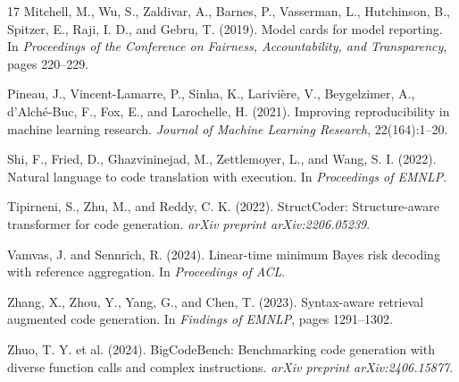 \documentclass{article}
\begin{document}
\begin{thebibliography}{17}
Mitchell, M., Wu, S., Zaldivar, A., Barnes, P., Vasserman, L., Hutchinson, B., Spitzer, E., Raji, I. D., and Gebru, T. (2019).
Model cards for model reporting.
In \emph{Proceedings of the Conference on Fairness, Accountability, and Transparency}, pages 220--229.

Pineau, J., Vincent-Lamarre, P., Sinha, K., Larivi\`ere, V., Beygelzimer, A., d'Alch\'e-Buc, F., Fox, E., and Larochelle, H. (2021).
Improving reproducibility in machine learning research.
\emph{Journal of Machine Learning Research}, 22(164):1--20.

Shi, F., Fried, D., Ghazvininejad, M., Zettlemoyer, L., and Wang, S. I. (2022).
Natural language to code translation with execution.
In \emph{Proceedings of EMNLP}.

Tipirneni, S., Zhu, M., and Reddy, C. K. (2022).
StructCoder: Structure-aware transformer for code generation.
\emph{arXiv preprint arXiv:2206.05239}.

Vamvas, J. and Sennrich, R. (2024).
Linear-time minimum Bayes risk decoding with reference aggregation.
In \emph{Proceedings of ACL}.

Zhang, X., Zhou, Y., Yang, G., and Chen, T. (2023).
Syntax-aware retrieval augmented code generation.
In \emph{Findings of EMNLP}, pages 1291--1302.

Zhuo, T. Y. et al. (2024).
BigCodeBench: Benchmarking code generation with diverse function calls and complex instructions.
\emph{arXiv preprint arXiv:2406.15877}.
\end{thebibliography}


\end{document}
